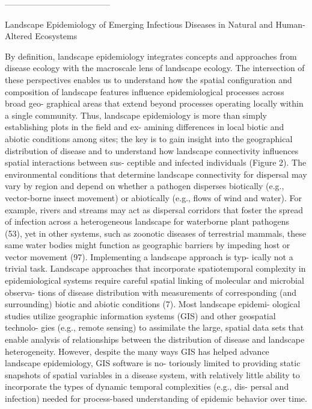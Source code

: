 --------------------------------------

Landscape Epidemiology
of Emerging Infectious
Diseases in Natural and
Human-Altered Ecosystems


By definition,
landscape epidemiology integrates concepts
and approaches from disease ecology with the
macroscale lens of landscape ecology. The
intersection of these perspectives enables us to
understand how the spatial configuration and
composition of landscape features influence
epidemiological processes across broad geo-
graphical areas that extend beyond processes
operating locally within a single community.
Thus, landscape epidemiology is more than
simply establishing plots in the field and ex-
amining differences in local biotic and abiotic
conditions among sites; the key is to gain insight
into the geographical distribution of disease
and to understand how landscape connectivity
influences spatial interactions between sus-
ceptible and infected individuals (Figure 2).
The environmental conditions that determine
landscape connectivity for dispersal may vary
by region and depend on whether a pathogen
disperses biotically (e.g., vector-borne insect
movement) or abiotically (e.g., flows of wind
and water). For example, rivers and streams
may act as dispersal corridors that foster the
spread of infection across a heterogeneous
landscape for waterborne plant pathogens (53),
yet in other systems, such as zoonotic diseases
of terrestrial mammals, these same water
bodies might function as geographic barriers
by impeding host or vector movement (97).
Implementing a landscape approach is typ-
ically not a trivial task. Landscape approaches
that incorporate spatiotemporal complexity in
epidemiological systems require careful spatial
linking of molecular and microbial observa-
tions of disease distribution with measurements
of corresponding (and surrounding) biotic and
abiotic conditions (7). Most landscape epidemi-
ological studies utilize geographic information
systems (GIS) and other geospatial technolo-
gies (e.g., remote sensing) to assimilate the
large, spatial data sets that enable analysis
of relationships between the distribution of
disease and landscape heterogeneity. However,
despite the many ways GIS has helped advance
landscape epidemiology, GIS software is no-
toriously limited to providing static snapshots
of spatial variables in a disease system, with
relatively little ability to incorporate the types
of dynamic temporal complexities (e.g., dis-
persal and infection) needed for process-based
understanding of epidemic behavior over time.



